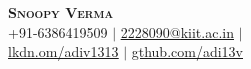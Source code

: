 \documentclass[A4,11pt]{article}
\begin{document}
\begin{comment}
In Europe it is common to include a picture of ones self in the CV. Select
which heading appropriate for the document you are creating.
\end{comment}


\begin{center}
    \textbf{\Huge \scshape Snoopy Verma} \\ \vspace{1pt} %
    \small +91-6386419509 $|$ 
    \href{mailto:2228090@kiit.ac.in}{\underline{2228090@kiit.ac.in}}   $|$ \\ 
    \href{https://lkdn.om/adiv1313}{\underline{lkdn.om/adiv1313}}  $|$
    \href{https://gthub.com/adi13v}{\underline{gthub.com/adi13v}}
\end{center}
  




\begin{comment}
This CV was written for specifically for positions I was applying for in
academia, and then modified to be a template.

A standard CV is about two pages long where as a resume in the US is one page.
sections can be added and removed here with this in mind. In my experience, 
education, and applicable work experience and skills are the most import things
to include on a resume. For a CV the Europass CV suggests the categories: Work
Experience, Education and Training, Language Skills, Digital Skills,
Communication and Interpersonal Skills, Conferences and Seminars, Creative Works
Driver's License, Hobbies and Interests, Honors and Awards, Management and
Leadership Skills, Networks and Memberships, Organizational Skills, Projects,
Publications, Recommendations, Social and Political Activities, Volunteering.

Your goal is to convey a who, what , when, where, why for every item you share. 
The who is obviously you, but I believe the rest should be done in that order.
For example below. An employer cares most about the degree held and typically 
less about the institution or where it is located (This is still good 
information though). Whatever order you choose be consistent throughout.
\end{comment}
\end{document}
